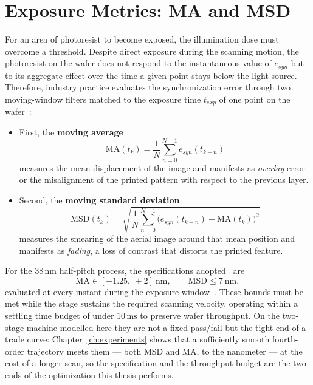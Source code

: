 \section{Exposure Metrics: MA and MSD}\label{sec:control_ma_msd}

For an area of photoresist to become exposed, the illumination dose must overcome a threshold. Despite direct exposure during the scanning motion, the photoresist on the wafer does not respond to the instantaneous value of $e_{syn}$ but to its aggregate effect over the time a given point stays below the light source. Therefore, industry practice evaluates the synchronization error through two moving-window filters matched to the exposure time $t_{exp}$ of one point on the wafer~\cite{Butler2011_PositionControl}:

\begin{itemize}
    \item First, the \textbf{moving average}
    \begin{equation}
        \mathrm{MA}(t_k) = \frac{1}{N}\sum_{n=0}^{N-1} e_{syn}(t_{k-n})
        \label{eq:ma}
    \end{equation}
    measures the mean displacement of the image and manifests as \textit{overlay} error or the misalignment of the printed pattern with respect to the previous layer.

    \item Second, the \textbf{moving standard deviation}
    \begin{equation}
        \mathrm{MSD}(t_k) = \sqrt{\frac{1}{N}\sum_{n=0}^{N-1} \Big(e_{syn}(t_{k-n}) - \mathrm{MA}(t_k)\Big)^{2}}
        \label{eq:msd}
    \end{equation}
    measures the smearing of the aerial image around that mean position and manifests as \textit{fading}, a loss of contrast that distorts the printed feature.
\end{itemize}

For the 38\,nm half-pitch process, the specifications adopted~\cite{Al-Rawashdeh2022_Caracterization} are
\begin{equation}
    \mathrm{MA} \in [-1.25,\ +2]\ \mathrm{nm}, \qquad \mathrm{MSD} \leq 7\ \mathrm{nm},
    \label{eq:ma_msd_spec}
\end{equation}
evaluated at every instant during the exposure window~\cite{Butler2011_PositionControl}. These bounds must be met while the stage sustains the required scanning velocity, operating within a settling time budget of under $10\,\mathrm{ms}$ to preserve wafer throughput. On the two-stage machine modelled here they are not a fixed pass/fail but the tight end of a trade curve: Chapter~\ref{ch:experiments} shows that a sufficiently smooth fourth-order trajectory meets them --- both MSD and MA, to the nanometer --- at the cost of a longer scan, so the specification and the throughput budget are the two ends of the optimization this thesis performs.

